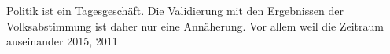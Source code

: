 \documentclass{Vorlage}
\begin{document}
Politik ist ein Tagesgeschäft. Die Validierung mit den Ergebnissen der Volksabstimmung ist daher nur eine Annäherung. Vor allem weil die Zeitraum auseinander 2015, 2011

\clearpage



 





\clearpage

\end{document}
